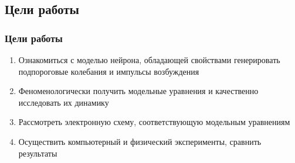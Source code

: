 \subsection{Цели работы}
\begin{frame}[t]
	\frametitle{Цели работы}
	\vfill
	\begin{spacing}{1}
		\begin{enumerate}
			\item Ознакомиться с моделью нейрона, обладающей свойствами генерировать  подпороговые колебания и импульсы возбуждения
			\item Феноменологически получить модельные уравнения и качественно исследовать их динамику
			\item Рассмотреть электронную схему, соответствующую модельным уравнениям
			\item Осуществить компьютерный и физический эксперименты, сравнить результаты
		\end{enumerate}
	\end{spacing}
	\vfill
\end{frame}

